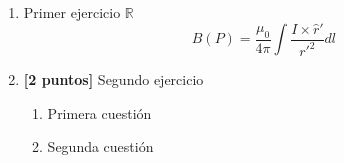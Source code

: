\documentclass[monocromo, marcaagua, bandapie, copyright]{UGR-examen}
\begin{document}
\begin{enumerate}

  \item Primer ejercicio $\mathbb{R}$
    \[
      B(P) = \frac{\mu_0}{4\pi} \int \frac{I\times \hat{r}'}{r'^2} dl
    \]

  \item \textbf{[2 puntos]} Segundo ejercicio
    \begin{enumerate}
      \item Primera cuestión
      \item Segunda cuestión
    \end{enumerate}

\end{enumerate}

\end{document}
